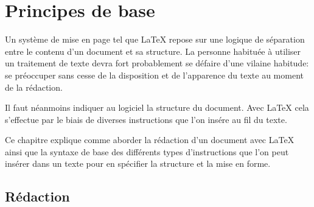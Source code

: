 \chapter{Principes de base}
\label{chap:bases}

Un système de mise en page tel que {\LaTeX} repose sur une logique de
séparation entre le contenu d'un document et sa structure. La personne
habituée à utiliser un traitement de texte devra fort probablement se
défaire d'une vilaine habitude: se préoccuper sans cesse de la
disposition et de l'apparence du texte au moment de la rédaction.

Il faut néanmoins indiquer au logiciel la structure du document. Avec
{\LaTeX} cela s'effectue par le biais de diverses instructions que
l'on insére au fil du texte.

Ce chapitre explique comme aborder la rédaction d'un document avec
{\LaTeX} ainsi que la syntaxe de base des différents types
d'instructions que l'on peut insérer dans un texte pour en spécifier
la structure et la mise en forme.


\section{Rédaction}
\label{chap:bases:redaction}

